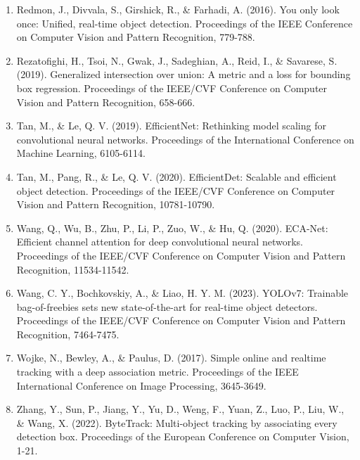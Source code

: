 \documentclass[12pt,a4paper]{article}
\begin{document}
\begin{enumerate}
\item Redmon, J., Divvala, S., Girshick, R., \& Farhadi, A. (2016). You only look once: Unified, real-time object detection. Proceedings of the IEEE Conference on Computer Vision and Pattern Recognition, 779-788.

\item Rezatofighi, H., Tsoi, N., Gwak, J., Sadeghian, A., Reid, I., \& Savarese, S. (2019). Generalized intersection over union: A metric and a loss for bounding box regression. Proceedings of the IEEE/CVF Conference on Computer Vision and Pattern Recognition, 658-666.

\item Tan, M., \& Le, Q. V. (2019). EfficientNet: Rethinking model scaling for convolutional neural networks. Proceedings of the International Conference on Machine Learning, 6105-6114.

\item Tan, M., Pang, R., \& Le, Q. V. (2020). EfficientDet: Scalable and efficient object detection. Proceedings of the IEEE/CVF Conference on Computer Vision and Pattern Recognition, 10781-10790.

\item Wang, Q., Wu, B., Zhu, P., Li, P., Zuo, W., \& Hu, Q. (2020). ECA-Net: Efficient channel attention for deep convolutional neural networks. Proceedings of the IEEE/CVF Conference on Computer Vision and Pattern Recognition, 11534-11542.

\item Wang, C. Y., Bochkovskiy, A., \& Liao, H. Y. M. (2023). YOLOv7: Trainable bag-of-freebies sets new state-of-the-art for real-time object detectors. Proceedings of the IEEE/CVF Conference on Computer Vision and Pattern Recognition, 7464-7475.

\item Wojke, N., Bewley, A., \& Paulus, D. (2017). Simple online and realtime tracking with a deep association metric. Proceedings of the IEEE International Conference on Image Processing, 3645-3649.

\item Zhang, Y., Sun, P., Jiang, Y., Yu, D., Weng, F., Yuan, Z., Luo, P., Liu, W., \& Wang, X. (2022). ByteTrack: Multi-object tracking by associating every detection box. Proceedings of the European Conference on Computer Vision, 1-21.

\end{enumerate}
\end{document}

